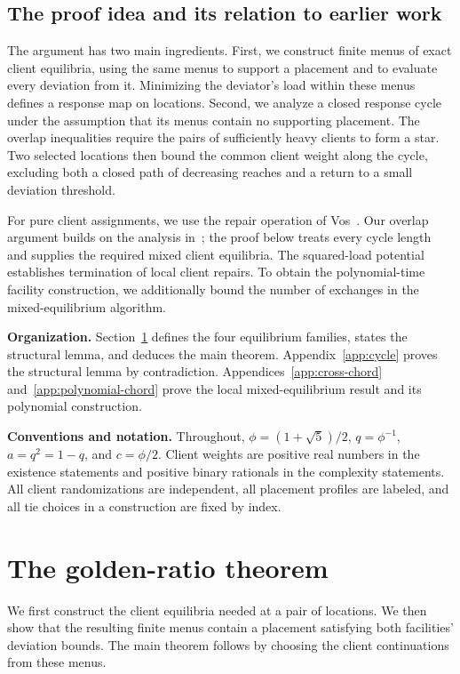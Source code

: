 \documentclass[11pt]{amsart}
\numberwithin{equation}{section}
\theoremstyle{definition}
\begin{document}
\subsection{The proof idea and its relation to earlier work}
The argument has two main ingredients. First, we construct finite menus of exact client equilibria, using the same menus to support a placement and to evaluate every deviation from it. Minimizing the deviator's load within these menus defines a response map on locations. Second, we analyze a closed response cycle under the assumption that its menus contain no supporting placement. The overlap inequalities require the pairs of sufficiently heavy clients to form a star. Two selected locations then bound the common client weight along the cycle, excluding both a closed path of decreasing reaches and a return to a small deviation threshold.

For pure client assignments, we use the repair operation of Vos~\cite[Lemma~29]{vos2023}. Our overlap argument builds on the analysis in~\cite[Section~8.3]{vos2023}; the proof below treats every cycle length and supplies the required mixed client equilibria. The squared-load potential establishes termination of local client repairs. To obtain the polynomial-time facility construction, we additionally bound the number of exchanges in the mixed-equilibrium algorithm.

\noindent\textbf{Organization.}
Section~\ref{sec:proof} defines the four equilibrium families, states the structural lemma, and deduces the main theorem. Appendix~\ref{app:cycle} proves the structural lemma by contradiction. Appendices~\ref{app:cross-chord} and~\ref{app:polynomial-chord} prove the local mixed-equilibrium result and its polynomial construction.

\noindent\textbf{Conventions and notation.}
Throughout, $\phi=(1+\sqrt5)/2$, $q=\phi^{-1}$, $a=q^2=1-q$, and $c=\phi/2$. Client weights are positive real numbers in the existence statements and positive binary rationals in the complexity statements. All client randomizations are independent, all placement profiles are labeled, and all tie choices in a construction are fixed by index.

\section{The golden-ratio theorem}\label{sec:proof}
We first construct the client equilibria needed at a pair of locations. We then show that the resulting finite menus contain a placement satisfying both facilities' deviation bounds. The main theorem follows by choosing the client continuations from these menus.
\end{document}
